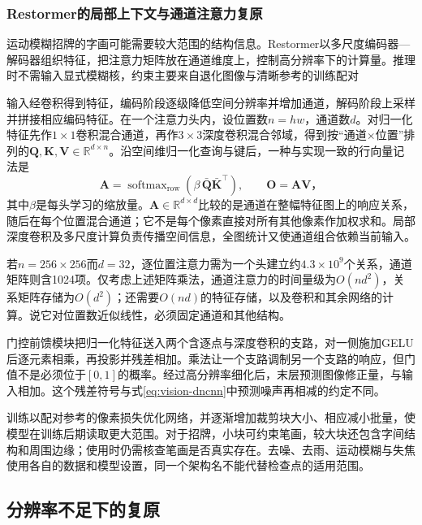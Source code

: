 \subsubsection{Restormer的局部上下文与通道注意力复原}
\label{sec:vision-restoration-restormer}

运动模糊招牌的字画可能需要较大范围的结构信息。Restormer以多尺度编码器—解码器组织特征，把注意力矩阵放在通道维度上，控制高分辨率下的计算量。推理时不需输入显式模糊核，约束主要来自退化图像与清晰参考的训练配对

输入经卷积得到特征，编码阶段逐级降低空间分辨率并增加通道，解码阶段上采样并拼接相应编码特征。在一个注意力头内，设位置数$n=hw$，通道数$d$。对归一化特征先作$1\times1$卷积混合通道，再作$3\times3$深度卷积混合邻域，得到按“通道$\times$位置”排列的$\bm{Q},\bm{K},\bm{V}\in\mathbb{R}^{d\times n}$。沿空间维归一化查询与键后，一种与实现一致的行向量记法是
\begin{equation}
 \bm{A}=\operatorname{softmax}_{\mathrm{row}}
       (\beta\,\bar{\bm{Q}}\bar{\bm{K}}^\top),
 \qquad
 \bm{O}=\bm{A}\bm{V}\text{，}
 \label{eq:vision-restormer-attention}
\end{equation}
其中$\beta$是每头学习的缩放量。$\bm{A}\in\mathbb{R}^{d\times d}$比较的是通道在整幅特征图上的响应关系，随后在每个位置混合通道；它不是每个像素直接对所有其他像素作加权求和。局部深度卷积及多尺度计算负责传播空间信息，全图统计又使通道组合依赖当前输入。

若$n=256\times256$而$d=32$，逐位置注意力需为一个头建立约$4.3\times10^9$个关系，通道矩阵则含1024项。仅考虑上述矩阵乘法，通道注意力的时间量级为$O(nd^2)$，关系矩阵存储为$O(d^2)$；还需要$O(nd)$的特征存储，以及卷积和其余网络的计算。说它对位置数近似线性，必须固定通道和其他结构。

门控前馈模块把归一化特征送入两个含逐点与深度卷积的支路，对一侧施加GELU后逐元素相乘，再投影并残差相加。乘法让一个支路调制另一个支路的响应，但门值不是必须位于$[0,1]$的概率。经过高分辨率细化后，末层预测图像修正量，与输入相加。这个残差符号与式\eqref{eq:vision-dncnn}中预测噪声再相减的约定不同。

训练以配对参考的像素损失优化网络，并逐渐增加裁剪块大小、相应减小批量，使模型在训练后期读取更大范围。对于招牌，小块可约束笔画，较大块还包含字间结构和周围边缘；使用时仍需核查笔画是否真实存在。去噪、去雨、运动模糊与失焦使用各自的数据和模型设置，同一个架构名不能代替检查点的适用范围。

\subsection{分辨率不足下的复原}
\label{sec:vision-restoration-super-resolution}

